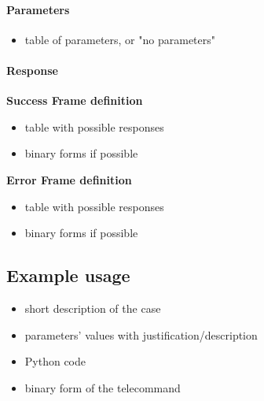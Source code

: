 \paragraph{Parameters}
    \begin{itemize}
    \item table of parameters, or "no parameters"
    \end{itemize}

\paragraph{Response}
    \textbf{Success Frame definition}
    \begin{itemize}
        \item table with possible responses
        \item binary forms if possible
    \end{itemize}


    \textbf{Error Frame definition}
    \begin{itemize}
        \item table with possible responses
        \item binary forms if possible
    \end{itemize}

\subsection{Example usage}

\begin{itemize}
    \item short description of the case
    \item parameters' values with justification/description
    \item Python code
    \item binary form of the telecommand
\end{itemize}
